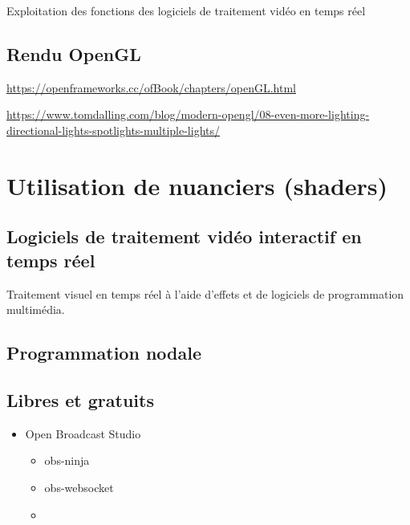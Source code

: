 \documentclass[
  french,
]{book}
\providecommand{\tightlist}{%
  \setlength{\itemsep}{0pt}\setlength{\parskip}{0pt}}
\begin{document}
Exploitation des fonctions des logiciels de traitement vidéo en temps réel

\hypertarget{rendu-opengl}{%
\subsection{Rendu OpenGL}\label{rendu-opengl}}

\url{https://openframeworks.cc/ofBook/chapters/openGL.html}

\url{https://www.tomdalling.com/blog/modern-opengl/08-even-more-lighting-directional-lights-spotlights-multiple-lights/}

\hypertarget{utilisation-de-nuanciers-shaders}{%
\section{Utilisation de nuanciers (shaders)}\label{utilisation-de-nuanciers-shaders}}

\hypertarget{traiter_logiciels}{%
\subsection{Logiciels de traitement vidéo interactif en temps réel}\label{traiter_logiciels}}

Traitement visuel en temps réel à l'aide d'effets et de logiciels de programmation multimédia.

\hypertarget{programmation-nodale}{%
\subsection{Programmation nodale}\label{programmation-nodale}}

\hypertarget{libres-et-gratuits}{%
\subsection{Libres et gratuits}\label{libres-et-gratuits}}

\begin{itemize}
\tightlist
\item
  Open Broadcast Studio

  \begin{itemize}
  \tightlist
  \item
    obs-ninja
  \item
    obs-websocket
  \item
  \end{itemize}
\end{itemize}
\end{document}
